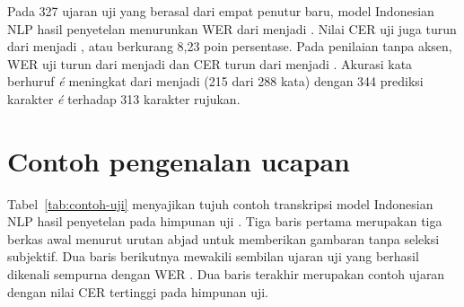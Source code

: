 Pada 327 ujaran uji yang berasal dari empat penutur baru, model Indonesian NLP hasil penyetelan menurunkan WER dari  menjadi . Nilai CER uji juga turun dari  menjadi , atau berkurang 8,23 poin persentase. Pada penilaian tanpa aksen, WER uji turun dari  menjadi  dan CER turun dari  menjadi . Akurasi kata berhuruf \textit{é} meningkat dari  menjadi  (215 dari 288 kata) dengan 344 prediksi karakter \textit{é} terhadap 313 karakter rujukan.

\section{Contoh pengenalan ucapan}

Tabel~\ref{tab:contoh-uji} menyajikan tujuh contoh transkripsi model Indonesian NLP hasil penyetelan pada himpunan uji \cite{repoasr}. Tiga baris pertama merupakan tiga berkas awal menurut urutan abjad untuk memberikan gambaran tanpa seleksi subjektif. Dua baris berikutnya mewakili sembilan ujaran uji yang berhasil dikenali sempurna dengan WER . Dua baris terakhir merupakan contoh ujaran dengan nilai CER tertinggi pada himpunan uji.

